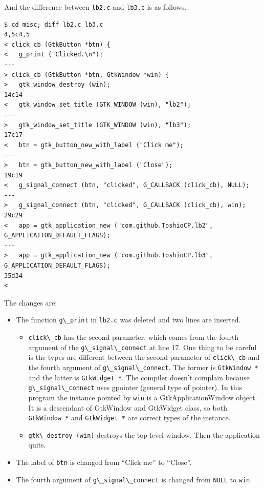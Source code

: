 And the difference between \passthrough{\lstinline!lb2.c!} and
\passthrough{\lstinline!lb3.c!} is as follows.

\begin{lstlisting}
$ cd misc; diff lb2.c lb3.c
4,5c4,5
< click_cb (GtkButton *btn) {
<   g_print ("Clicked.\n");
---
> click_cb (GtkButton *btn, GtkWindow *win) {
>   gtk_window_destroy (win);
14c14
<   gtk_window_set_title (GTK_WINDOW (win), "lb2");
---
>   gtk_window_set_title (GTK_WINDOW (win), "lb3");
17c17
<   btn = gtk_button_new_with_label ("Click me");
---
>   btn = gtk_button_new_with_label ("Close");
19c19
<   g_signal_connect (btn, "clicked", G_CALLBACK (click_cb), NULL);
---
>   g_signal_connect (btn, "clicked", G_CALLBACK (click_cb), win);
29c29
<   app = gtk_application_new ("com.github.ToshioCP.lb2", G_APPLICATION_DEFAULT_FLAGS);
---
>   app = gtk_application_new ("com.github.ToshioCP.lb3", G_APPLICATION_DEFAULT_FLAGS);
35d34
< 
\end{lstlisting}

The changes are:

\begin{itemize}
\tightlist
\item
  The function \passthrough{\lstinline!g\_print!} in
  \passthrough{\lstinline!lb2.c!} was deleted and two lines are
  inserted.

  \begin{itemize}
  \tightlist
  \item
    \passthrough{\lstinline!click\_cb!} has the second parameter, which
    comes from the fourth argument of the
    \passthrough{\lstinline!g\_signal\_connect!} at line 17. One thing
    to be careful is the types are different between the second
    parameter of \passthrough{\lstinline!click\_cb!} and the fourth
    argument of \passthrough{\lstinline!g\_signal\_connect!}. The former
    is \passthrough{\lstinline!GtkWindow *!} and the latter is
    \passthrough{\lstinline!GtkWidget *!}. The compiler doesn't complain
    because \passthrough{\lstinline!g\_signal\_connect!} uses gpointer
    (general type of pointer). In this program the instance pointed by
    \passthrough{\lstinline!win!} is a GtkApplicationWindow object. It
    is a descendant of GtkWindow and GtkWidget class, so both
    \passthrough{\lstinline!GtkWindow *!} and
    \passthrough{\lstinline!GtkWidget *!} are correct types of the
    instance.
  \item
    \passthrough{\lstinline!gtk\_destroy (win)!} destroys the top-level
    window. Then the application quits.
  \end{itemize}
\item
  The label of \passthrough{\lstinline!btn!} is changed from ``Click
  me'' to ``Close''.
\item
  The fourth argument of \passthrough{\lstinline!g\_signal\_connect!} is
  changed from \passthrough{\lstinline!NULL!} to
  \passthrough{\lstinline!win!}.
\end{itemize}

